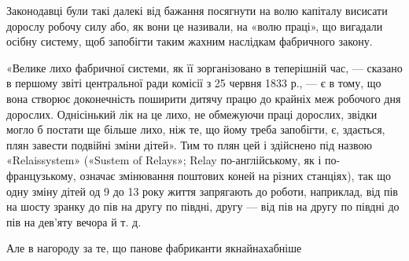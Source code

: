 Законодавці були такі далекі від бажання посягнути на волю
капіталу висисати дорослу робочу силу або, як вони це називали,
на «волю праці», що вигадали осібну систему, щоб запобігти
таким жахним наслідкам фабричного закону.

«Велике лихо фабричної системи, як її зорганізовано в теперішній
час, — сказано в першому звіті центральної ради комісії
з 25 червня 1833 р., — є в тому, що вона створює доконечність
поширити дитячу працю до крайніх меж робочого дня дорослих.
Однісінький лік на це лихо, не обмежуючи праці дорослих, звідки
могло б постати ще більше лихо, ніж те, що йому треба запобігти,
є, здається, плян завести подвійні зміни дітей». Тим то плян цей
і здійснено під назвою «Relaissystem» («Sustem of Relays»; Relay
по-англійському, як і по-французькому, означає змінювання
поштових коней на різних станціях), так що одну зміну дітей
од 9 до 13 року життя запрягають до роботи, наприклад, від пів
на шосту зранку до пів на другу по півдні, другу — від пів на другу
по півдні до пів на дев’яту вечора й т. д.

Але в нагороду за те, що панове фабриканти якнайнахабніше
\parbreak{}  %
